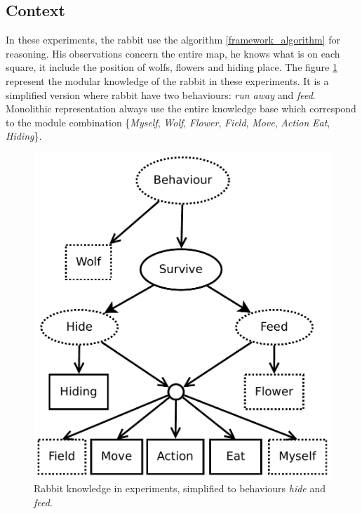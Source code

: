 \documentclass{aamas2012}
\begin{document}
\subsection{Context}
	
	In these experiments, the rabbit use the algorithm \ref{framework_algorithm} for reasoning.
	His observations concern the entire map, he knows what is on each square, it include the position of wolfs, flowers and hiding place.
	The figure \ref{modular_knowledge_experiment} represent the modular knowledge of the rabbit in these experiments.
	It is a simplified version where rabbit have two behaviours: \textit{run away} and \textit{feed}.
	Monolithic representation always use the entire knowledge base which correspond to the module combination
	\{\textit{Myself}, \textit{Wolf}, \textit{Flower}, \textit{Field}, \textit{Move}, \textit{Action} \textit{Eat}, \textit{Hiding}\}.
	
	\begin{figure}
		\centering
		\includegraphics[keepaspectratio=true, scale=0.4]{modular_knowledge_experiment.pdf}
		\caption
		{
			\label{modular_knowledge_experiment}
			Rabbit knowledge in experiments, simplified to behaviours \emph{hide} and \emph{feed}.
		}
	\end{figure}
	
\end{document}
